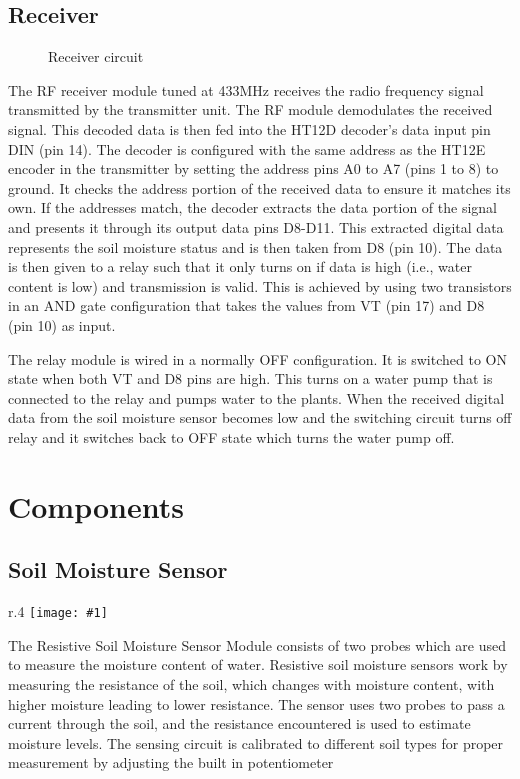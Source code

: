\documentclass[12pt, a4paper]{report}
\newcommand{\addsvg}[2]{}
\newcommand{\addimg}[2]{\texttt{[image: \#1]}}
\newcommand{\floatfig}[6]{
  \begin{wrapfigure}{#1}{#2\textwidth}
    \centering
    \addimg{images/#3}{#4\linewidth}
    \caption{\centering #5}
    \vspace*{#6}
  \end{wrapfigure}
}
\begin{document}
\newpage

\section{Receiver}
\begin{figure}[ht]
  \centering
  \addsvg{images/rx}{.8\linewidth}
  \caption{Receiver circuit}
\end{figure}

The RF receiver module tuned at 433MHz receives the radio frequency
signal transmitted by the transmitter unit. The RF module demodulates
the received signal. This decoded data is then fed into the HT12D
decoder’s data input pin DIN (pin 14). The decoder is configured with
the same address as the HT12E encoder in the transmitter by setting
the address pins A0 to A7 (pins 1 to 8) to ground. It checks the
address portion of the received data to ensure it matches its own. If
the addresses match, the decoder extracts the data portion of the
signal and presents it through its output data pins D8-D11. This
extracted digital data represents the soil moisture status and is
then taken from D8 (pin 10). The data is then given to a relay such
that it only turns on if data is high (i.e., water content is low)
and transmission is valid. This is achieved by using two transistors
in an AND gate configuration that takes the values from VT (pin 17)
and D8 (pin 10) as input.

The relay module is wired in a normally OFF configuration. It is
switched to ON state when both VT and D8 pins are high. This turns on
a water pump that is connected to the relay and pumps water to the
plants. When the received digital data from the soil moisture sensor
becomes low and the switching circuit turns off relay and it switches
back to OFF state which turns the water pump off.

\newpage

\chapter{Components}

\section{Soil Moisture Sensor}

\setlength\intextsep{0pt}
\setlength{\columnsep}{.6cm}
\floatfig{r}{.4}{sms.png}{1}{Soil moisture sensor}{.4cm}

The Resistive Soil Moisture Sensor Module consists of two probes
which are used to measure the moisture content of water. Resistive
soil moisture sensors work by measuring the resistance of the soil,
which changes with moisture content, with higher moisture leading to
lower resistance. The sensor uses two probes to pass a current
through the soil, and the resistance encountered is used to estimate
moisture levels. The sensing circuit is calibrated to different soil
types for proper measurement by adjusting the built in potentiometer
\end{document}
